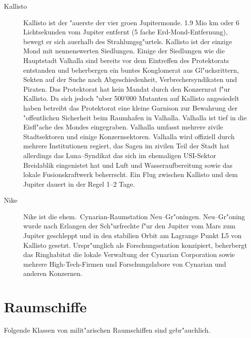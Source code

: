 \begin{description}
\item [Kallisto] Kallisto ist der "au\3erste der vier gro\3en Jupitermonde. 1.9 Mio km oder 6 Lichtsekunden vom Jupiter
      entfernt (5 fache Erd-Mond-Entfernung), bewegt er sich au\3erhalb des Strahlungsg"urtels. Kallisto ist der einzige Mond mit nennenswerten Siedlungen. Einige der Siedlungen wie die Hauptstadt Valhalla sind bereits vor dem Eintreffen des Protektorats entstanden und beherbergen ein buntes Konglomerat aus Gl"ucksrittern, Sekten auf der Suche nach Abgeschiedenheit, Verbrechersyndikaten und Piraten. Das Protektorat hat kein Mandat durch den Konzernrat f"ur Kallisto. Da sich jedoch "uber 500'000 Mutanten auf Kallisto angesiedelt haben betreibt das Protektorat eine kleine Garnison zur Bewahrung der "offentlichen Sicherheit beim Raumhafen in Valhalla. Valhalla ist tief in die Eisfl"ache des Mondes eingegraben. Valhalla umfasst mehrere zivile Stadtsektoren und einige Konzernsektoren. Valhalla wird offiziell durch mehrere Institutionen regiert, das Sagen im zivilen Teil der Stadt hat allerdings das Luna--Syndikat das sich im ehemaligen USI-Sektor Breidablik eingenistet hat und Luft und Wasseraufbereitung sowie das lokale Fusionskraftwerk beherrscht. Ein Flug zwischen Kallisto und dem Jupiter dauert in der Regel 1--2 Tage. %
\item [Nike] Nike ist die ehem.~Cynarian-Raumstation Neu--Gr"oningen. Neu--Gr"oning wurde nach Erlangen der
      Sch"urfrechte f"ur den Jupiter vom Mars zum Jupiter geschleppt und in den stabilien Orbit am Lagrange Punkt L5 von Kallisto gesetzt. Urspr"unglich als Forschungsstation konzipiert, beherbergt das Ringhabitat die lokale Verwaltung der Cynarian Corporation sowie mehrere High-Tech-Firmen und Forschungslabore von Cynarian und anderen Konzernen.
\end{description}

\section{Raumschiffe}

Folgende Klassen von milit"arischen Raumschiffen sind gebr"auchlich.

